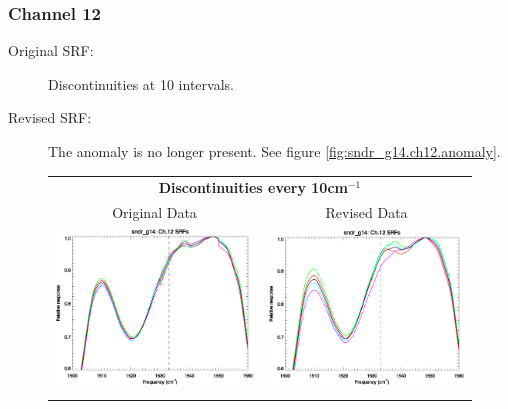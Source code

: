 \subsubsection{Channel 12}
\begin{description}
  \item[Original SRF:] Discontinuities at 10\invcm{} intervals.
  \item[Revised SRF:]  The anomaly is no longer present. See figure \ref{fig:sndr_g14.ch12.anomaly}.
\end{description}

\begin{figure}[htp]
  \centering
  \begin{tabular}{c c}
    \multicolumn{2}{c}{\textsf{\bfseries Discontinuities every 10cm$^{-1}$}} \\
    \hspace{1.5em}\textsf{Original Data} &
    \hspace{1.5em}\textsf{Revised Data} \\
    \includegraphics[scale=0.5,trim=0 40 0 0]{graphics/zoom_anomaly/original/sndr_g14.ch12.srf.eps} &
    \includegraphics[scale=0.5,trim=0 40 0 0]{graphics/zoom_anomaly/revised/sndr_g14.ch12.srf.eps} \\\\

\end{tabular}
\end{figure}
